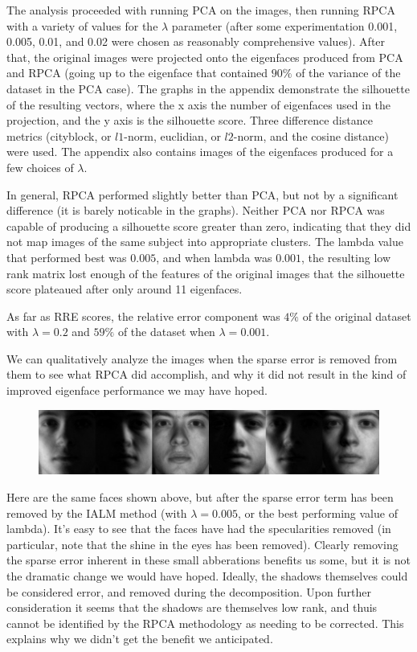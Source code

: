 \documentclass[11pt]{scrartcl} %
\theoremstyle{plain}
\begin{document}
The analysis proceeded with running PCA on the images, then running RPCA with a variety of values for the $\lambda$ parameter (after some experimentation 0.001, 0.005, 0.01, and 0.02 were chosen as reasonably comprehensive values). After that, the original images were projected onto the eigenfaces produced from PCA and RPCA (going up to the eigenface that contained $90\%$ of the variance of the dataset in the PCA case). The graphs in the appendix demonstrate the silhouette of the resulting vectors, where the x axis the number of eigenfaces used in the projection, and the y axis is the silhouette score. Three difference distance metrics (cityblock, or $l1$-norm, euclidian, or $l2$-norm, and the cosine distance) were used. The appendix also contains images of the eigenfaces produced for a few choices of $\lambda$.

In general, RPCA performed slightly better than PCA, but not by a significant difference (it is barely noticable in the graphs). Neither PCA nor RPCA was capable of producing a silhouette score greater than zero, indicating that they did not map images of the same subject into appropriate clusters. The lambda value that performed best was $0.005$, and when lambda was $0.001$, the resulting low rank matrix lost enough of the features of the original images that the silhouette score plateaued after only around 11 eigenfaces.

As far as RRE scores, the relative error component was $4\%$ of the original dataset with $\lambda = 0.2$ and $59\%$ of the dataset when $\lambda = 0.001$.

We can qualitatively analyze the images when the sparse error is removed from them to see what RPCA did accomplish, and why it did not result in the kind of improved eigenface performance we may have hoped. 

\begin{figure}[H]
\includegraphics[width=\textwidth]{figures/person24Afterl=0dot005RPCAtrial1.jpg} 
\centering
\end{figure}

Here are the same faces shown above, but after the sparse error term has been removed by the IALM method (with $\lambda = 0.005$, or the best performing value of lambda). It's easy to see that the faces have had the specularities removed (in particular, note that the shine in the eyes has been removed). Clearly removing the sparse error inherent in these small abberations benefits us some, but it is not the dramatic change we would have hoped. Ideally, the shadows themselves could be considered error, and removed during the decomposition. Upon further consideration it seems that the shadows are themselves low rank, and thuis cannot be identified by the RPCA methodology as needing to be corrected. This explains why we didn't get the benefit we anticipated.
\end{document}
